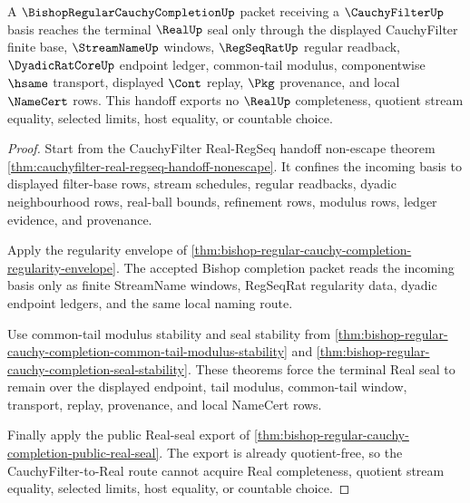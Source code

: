 \begin{theorem}
\label{thm:bishop-regular-cauchy-completion-filter-real-handoff}
A $\BishopRegularCauchyCompletionUp$ packet receiving a $\CauchyFilterUp$
basis reaches the terminal $\RealUp$ seal only through the displayed
CauchyFilter finite base, $\StreamNameUp$ windows, $\RegSeqRatUp$ regular
readback, $\DyadicRatCoreUp$ endpoint ledger, common-tail modulus,
componentwise $\hsame$ transport, displayed $\Cont$ replay, $\Pkg$
provenance, and local $\NameCert$ rows. This handoff exports no $\RealUp$
completeness, quotient stream equality, selected limits, host equality, or
countable choice.
\end{theorem}
\begin{proof}
Start from the CauchyFilter Real-RegSeq handoff non-escape theorem
\autoref{thm:cauchyfilter-real-regseq-handoff-nonescape}. It confines the
incoming basis to displayed filter-base rows, stream schedules, regular
readbacks, dyadic neighbourhood rows, real-ball bounds, refinement rows,
modulus rows, ledger evidence, and provenance.

Apply the regularity envelope of
\autoref{thm:bishop-regular-cauchy-completion-regularity-envelope}. The
accepted Bishop completion packet reads the incoming basis only as finite
StreamName windows, RegSeqRat regularity data, dyadic endpoint ledgers, and
the same local naming route.

Use common-tail modulus stability and seal stability from
\autoref{thm:bishop-regular-cauchy-completion-common-tail-modulus-stability}
and \autoref{thm:bishop-regular-cauchy-completion-seal-stability}. These
theorems force the terminal Real seal to remain over the displayed endpoint,
tail modulus, common-tail window, transport, replay, provenance, and local
NameCert rows.

Finally apply the public Real-seal export of
\autoref{thm:bishop-regular-cauchy-completion-public-real-seal}. The export
is already quotient-free, so the CauchyFilter-to-Real route cannot acquire
Real completeness, quotient stream equality, selected limits, host equality,
or countable choice.
\end{proof}

